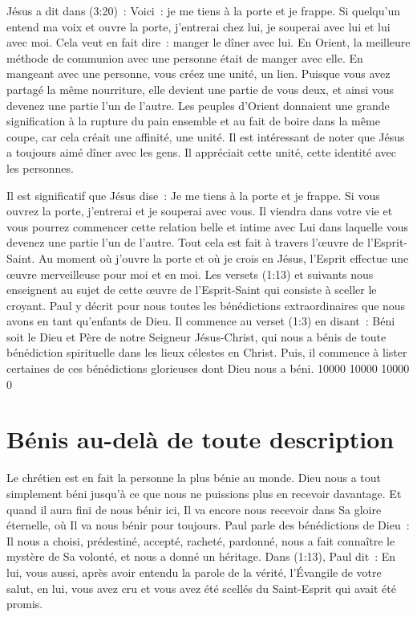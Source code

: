 Jésus a dit dans (3:20)~:
 \og Voici~: je me tiens à la porte et je frappe.
 Si quelqu'un entend ma voix et ouvre la porte,
 j'entrerai chez lui, je souperai avec lui et lui avec moi. \fg{}
 Cela veut en fait dire~: \og manger le dîner avec lui. \fg{}
 En Orient, la meilleure méthode de communion avec une personne
 était de manger avec elle. En mangeant avec une personne,
 vous créez une unité, un lien.
 Puisque vous avez partagé la même nourriture, elle devient une partie
 de vous deux, et ainsi vous devenez une partie l'un de l'autre.
 Les peuples d'Orient donnaient une grande signification à la rupture
 du pain ensemble et au fait de boire dans la même coupe,
 car cela créait une affinité, une unité.
 Il est intéressant de noter que Jésus a toujours aimé dîner avec les gens.
 Il appréciait cette unité, cette identité avec les personnes.


Il est significatif que Jésus dise~:
 \og Je me tiens à la porte et je frappe.
 Si vous ouvrez la porte, j'entrerai et je souperai avec vous. \fg{}
 Il viendra dans votre vie et vous pourrez commencer cette relation belle
 et intime avec Lui dans laquelle vous devenez une partie l'un de l'autre.
 Tout cela est fait à travers l'œuvre de l'Esprit-Saint.
 Au moment où j'ouvre la porte et où je crois en Jésus,
 l'Esprit effectue une œuvre merveilleuse pour moi et en moi.
 Les versets (1:13) et suivants nous enseignent
 au sujet de cette œuvre de l'Esprit-Saint qui consiste à sceller le croyant.
 Paul y décrit pour nous toutes les bénédictions extraordinaires
 que nous avons en tant qu'enfants de Dieu.
 Il commence au verset (1:3) en disant~:
 \og Béni soit le Dieu et Père de notre Seigneur Jésus-Christ,
 qui nous a bénis de toute bénédiction spirituelle
 dans les lieux célestes en Christ. \fg{}
 Puis, il commence à lister certaines de ces bénédictions glorieuses
 dont Dieu nous a béni.
 \begingroup{} 10000 10000 10000 0
 \par\endgroup


\section*{Bénis au-delà de toute description}

Le chrétien est en fait la personne la plus bénie au monde.
 Dieu nous a tout simplement béni jusqu'à ce que nous ne puissions plus
 en recevoir davantage.
 Et quand il aura fini de nous bénir ici, Il va encore nous recevoir
 dans Sa gloire éternelle, où Il va nous bénir pour toujours.
 Paul parle des bénédictions de Dieu~: Il nous a choisi, prédestiné,
 accepté, racheté, pardonné, nous a fait connaître
 le mystère de Sa volonté, et nous a donné un héritage.
 Dans (1:13), Paul dit~:
 \og En lui, vous aussi, après avoir entendu la parole de la vérité,
 l'Évangile de votre salut, en lui, vous avez cru et vous avez été scellés
 du Saint-Esprit qui avait été promis. \fg{}

